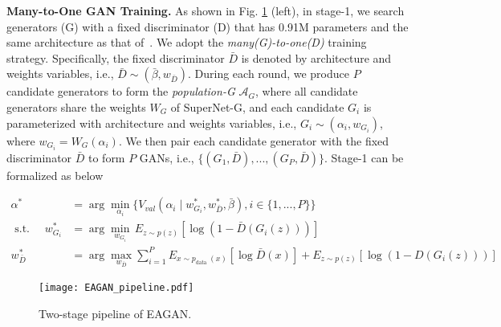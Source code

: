\documentclass[runningheads]{llncs}
\begin{document}
\textbf{Many-to-One GAN Training.} As shown in Fig. \ref{fig:EAGAN} (left), in stage-1, we search generators (G) with a fixed discriminator (D) that has 0.91M parameters and the same architecture as that of~\cite{Adversarialnas}. We adopt the \textit{many(G)-to-one(D)} training strategy. Specifically, the fixed discriminator $\bar{D}$ is denoted by architecture and weights variables, i.e., $\bar{D} \sim (\bar{\beta},w_{\bar{D}})$. During each round, we produce $P$ candidate generators to form the \textit{population-G} $\mathcal{A}_G$, where all candidate generators share the weights $W_G$ of SuperNet-G, and each candidate $G_{ i }$ is parameterized with architecture and weights variables, i.e., $G_{ i } \sim (\alpha_{ i },w_{G_{ i }})$, where $w_{G_{ i }}=W_G(\alpha_{ i })$. We then pair each candidate generator with the fixed discriminator $\bar{D}$ to form $P$ GANs, i.e., $\{(G_1,\bar{D}),...,(G_P,\bar{D})\}$. Stage-1 can be formalized as below







\begin{align}
\alpha^{*} &=\arg \min _{\alpha_{ i }} \{ V_{val}\left(\alpha_{ i } \mid w_{G_{ i }}^{*}, w_{\bar{D}}^{*}, \bar{\beta}\right) , i\in\{1,...,P\}\} \label{eq:stage1_eq1} \\
\text { s.t. } \quad w_{G_{ i }}^{*} &=\arg \min _{w_{G_{ i }}} \,  E_{z \sim p(z)}\left[\log \left(1-\bar{D}\left(G_{ i }(z)\right)\right)\right] \label{eq:stage1_eq2} \\
w_{\bar{D}}^{*} &=\arg \max _{w_{\bar{D}}} \sum_{i=1}^{P}  E_{x \sim p_{\text {data }}(x)}[\log \bar{D}(x)]+  E_{z \sim p(z)} [\log  (1-D (G_{ i }(z) ) ) ]  \label{eq:stage1_eq3}
\end{align}





\begin{figure}
    \centering
    \texttt{[image: EAGAN\_pipeline.pdf]}
    \caption{Two-stage pipeline of EAGAN. 
}
    \label{fig:EAGAN}
\end{figure}
\end{document}
